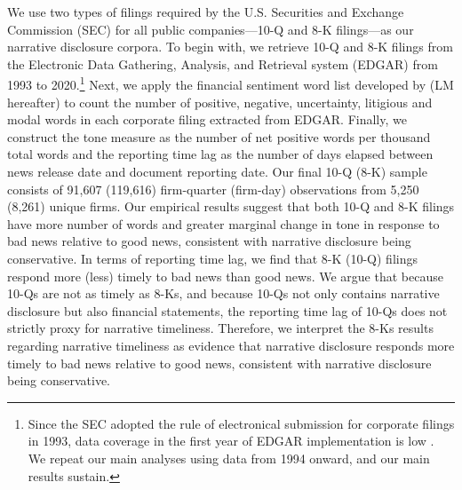 \documentclass[a4paper]{article}
\begin{document}
\begin{spacing}{2}
We use two types of filings required by the U.S. Securities and Exchange Commission (SEC) for all public companies---10-Q and 8-K filings---as our narrative disclosure corpora. To begin with, we retrieve 10-Q and 8-K filings from the Electronic Data Gathering, Analysis, and Retrieval system (EDGAR) from 1993 to 2020.\footnote{Since the SEC adopted the rule of electronical submission for corporate filings in 1993, data coverage in the first year of EDGAR implementation is low . We repeat our main analyses using data from 1994 onward, and our main results sustain.} Next, we apply the financial sentiment word list developed by  (LM hereafter) to count the number of positive, negative, uncertainty, litigious and modal words in each corporate filing extracted from EDGAR. Finally, we construct the tone measure as the number of net positive words per thousand total words and the reporting time lag as the number of days elapsed between news release date and document reporting date. Our final 10-Q (8-K) sample consists of 91,607 (119,616) firm-quarter (firm-day) observations from 5,250 (8,261) unique firms. Our empirical results suggest that both 10-Q and 8-K filings have more number of words and greater marginal change in tone in response to bad news relative to good news, consistent with narrative disclosure being conservative. In terms of reporting time lag, we find that 8-K (10-Q) filings respond more (less) timely to bad news than good news. We argue that because 10-Qs are not as timely as 8-Ks, and because 10-Qs not only contains narrative disclosure but also financial statements, the reporting time lag of 10-Qs does not strictly proxy for narrative timeliness. Therefore, we interpret the 8-Ks results regarding narrative timeliness as evidence that narrative disclosure responds more timely to bad news relative to good news, consistent with narrative disclosure being conservative.


\end{spacing}
\end{document}
